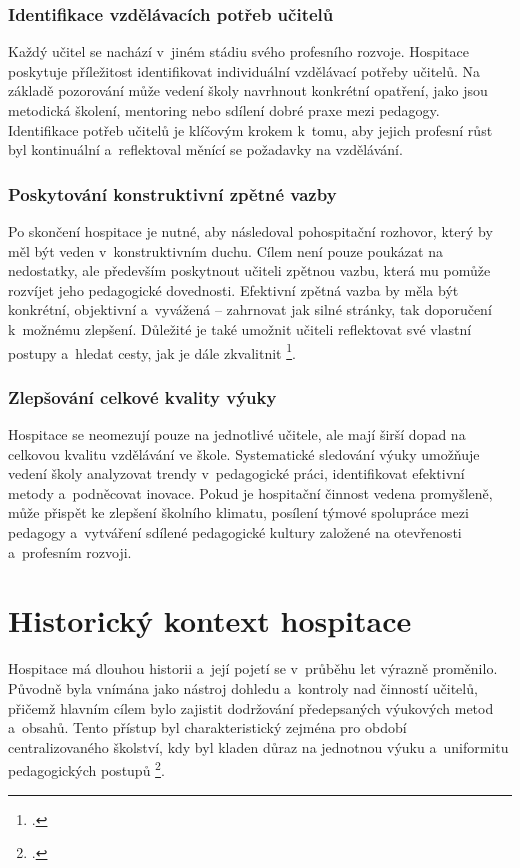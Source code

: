 \subsubsection{Identifikace vzdělávacích potřeb učitelů}

Každý učitel se nachází v~jiném stádiu svého profesního rozvoje. Hospitace poskytuje příležitost identifikovat individuální vzdělávací potřeby učitelů. Na základě pozorování může vedení školy navrhnout konkrétní opatření, jako jsou metodická školení, mentoring nebo sdílení dobré praxe mezi pedagogy. Identifikace potřeb učitelů je klíčovým krokem k~tomu, aby jejich profesní růst byl kontinuální a~reflektoval měnící se požadavky na vzdělávání.

\subsubsection{Poskytování konstruktivní zpětné vazby}

Po skončení hospitace je nutné, aby následoval pohospitační rozhovor, který by měl být veden v~konstruktivním duchu. Cílem není pouze poukázat na nedostatky, ale především poskytnout učiteli zpětnou vazbu, která mu pomůže rozvíjet jeho pedagogické dovednosti. Efektivní zpětná vazba by měla být konkrétní, objektivní a~vyvážená – zahrnovat jak silné stránky, tak doporučení k~možnému zlepšení. Důležité je také umožnit učiteli reflektovat své vlastní postupy a~hledat cesty, jak je dále zkvalitnit \footcite[11]{rozvijejici-hospitace}. 

\subsubsection{Zlepšování celkové kvality výuky}

Hospitace se neomezují pouze na jednotlivé učitele, ale mají širší dopad na celkovou kvalitu vzdělávání ve škole. Systematické sledování výuky umožňuje vedení školy analyzovat trendy v~pedagogické práci, identifikovat efektivní metody a~podněcovat inovace. Pokud je hospitační činnost vedena promyšleně, může přispět ke zlepšení školního klimatu, posílení týmové spolupráce mezi pedagogy a~vytváření sdílené pedagogické kultury založené na otevřenosti a~profesním rozvoji.


\section{Historický kontext hospitace}

Hospitace má dlouhou historii a~její pojetí se v~průběhu let výrazně proměnilo. Původně byla vnímána jako nástroj dohledu a~kontroly nad činností učitelů, přičemž hlavním cílem bylo zajistit dodržování předepsaných výukových metod a~obsahů. Tento přístup byl charakteristický zejména pro období centralizovaného školství, kdy byl kladen důraz na jednotnou výuku a~uniformitu pedagogických postupů \footcite[119]{ped-proces-rizeni}.

